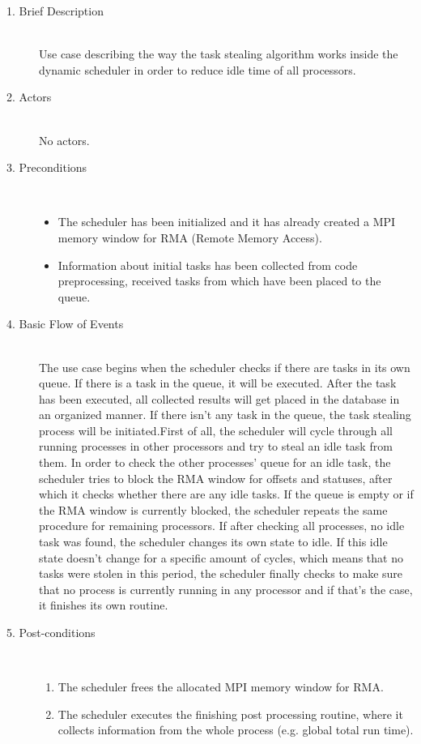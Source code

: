 \begin{description}
	\item [1. Brief Description]\hfill \\
	Use case describing the way the task stealing algorithm works inside the dynamic scheduler in order to reduce idle time of all processors.
	
	\item [2. Actors]\hfill \\
	No actors. 
	
	
	\item [3. Preconditions]\hfill \\
	\vspace{-6.5mm}
	\begin{itemize}
		\item The scheduler has been initialized and it has already created a MPI memory window for RMA (Remote Memory Access).
		\item Information about initial tasks has been collected from code preprocessing, received tasks from which have been placed to the queue.
	\end{itemize}
	
	\item [4. Basic Flow of Events]\hfill \\
	The use case begins when the scheduler checks if there are tasks in its own queue. If there is a task in the queue, it will be executed. After the task has been executed, all collected results will get placed in the database in an organized manner.
	If there isn't any task in the queue, the task stealing process will be initiated.\newline First of all, the scheduler will cycle through all running processes in other processors and try to steal an idle task from them. In order to check the other processes' queue for an idle task, the scheduler tries to block the RMA window for offsets and statuses, after which it checks whether there are any idle tasks. If the queue is empty or if the RMA window is currently blocked, the scheduler repeats the same procedure for remaining processors. If after checking all processes, no idle task was found, the scheduler changes its own state to idle. If this idle state doesn't change for a specific amount of cycles, which means that no tasks were stolen in this period, the scheduler finally checks to make sure that no process is currently running in any processor and if that's the case, it finishes its own routine. 
	
	
	\item [5. Post-conditions]\hfill \\
	\vspace{-6.5mm}
	\begin{enumerate}
		\item The scheduler frees the allocated MPI memory window for RMA.
		\item The scheduler executes the finishing post processing routine, where it collects information from the whole process (e.g. global total run time).
	\end{enumerate}
	

\end{description}
